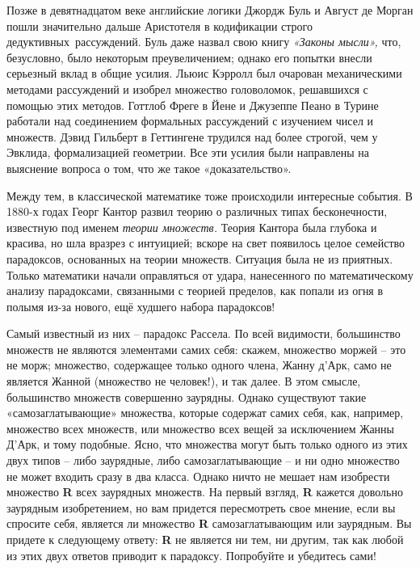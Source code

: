 \documentclass[../main.tex]{subfiles}
\begin{document}
Позже в девятнадцатом веке английские логики Джордж Буль и Август де Морган пошли значительно дальше Аристотеля в кодификации строго дедуктивных~рассуждений. Буль даже назвал свою книгу \emph{«Законы мысли»,} что, безусловно, было некоторым преувеличением; однако его попытки внесли серьезный вклад в общие усилия. Льюис Кэрролл был очарован механическими методами рассуждений и изобрел множество головоломок, решавшихся с помощью этих методов. Готтлоб Фреге в Йене и Джузеппе Пеано в Турине работали над соединением формальных рассуждений с изучением чисел и множеств. Дэвид Гильберт в Геттингене трудился над более строгой, чем у Эвклида, формализацией геометрии. Все эти усилия были направлены на выяснение вопроса о том, что же такое «доказательство».

Между тем, в классической математике тоже происходили интересные события. В 1880-х годах Георг Кантор развил теорию о различных типах бесконечности, известную под именем \emph{теории множеств.} Теория Кантора была глубока и красива, но шла вразрез с интуицией; вскоре на свет появилось целое семейство парадоксов, основанных на теории множеств. Ситуация была не из приятных. Только математики начали оправляться от удара, нанесенного по математическому анализу парадоксами, связанными с теорией пределов, как попали из огня в полымя из-за нового, ещё худшего набора парадоксов!

Самый известный из них \--- парадокс Рассела. По всей видимости, большинство множеств не являются элементами самих себя: скажем, множество моржей \--- это не морж; множество, содержащее только одного члена, Жанну д'Арк, само не является Жанной (множество не человек!), и так далее. В этом смысле, большинство множеств совершенно заурядны. Однако существуют такие «самозаглатывающие» множества, которые содержат самих себя, как, например, множество всех множеств, или множество всех вещей за исключением Жанны Д'Арк, и тому подобные. Ясно, что множества могут быть только одного из этих двух типов \--- либо заурядные, либо самозаглатывающие \--- и ни одно множество не может входить сразу в два класса. Однако ничто не мешает нам изобрести множество \textbf{R} всех заурядных множеств. На первый взгляд, \textbf{R} кажется довольно заурядным изобретением, но вам придется пересмотреть свое мнение, если вы спросите себя, является ли множество \textbf{R} самозаглатывающим или заурядным. Вы придете к следующему ответу: \textbf{R} не является ни тем, ни другим, так как любой из этих двух ответов приводит к парадоксу. Попробуйте и убедитесь сами!
\end{document}
